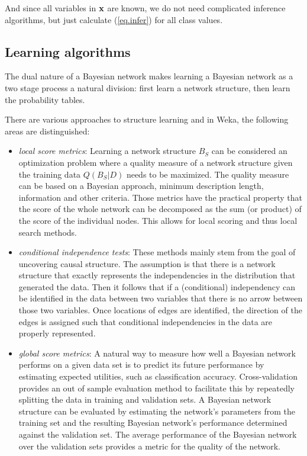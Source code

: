 And since all variables in ${\bf x}$ are known, we do not need complicated inference
algorithms, but just calculate (\ref{eq.infer}) for all class values.

\subsection*{Learning algorithms}

The dual nature of a Bayesian network makes learning a Bayesian
network as a two stage process a natural division: first learn a
network structure, then learn the probability tables.

There are various approaches to structure learning and in Weka, the
following areas are distinguished:

\begin{itemize}
\item {\em local score metrics}: 
Learning a network structure $B_S$ can be considered an optimization
problem where a quality measure of a network structure given the
training data $Q(B_S|D)$ needs to be maximized. The quality measure
can be based on a Bayesian approach,  minimum description length,
information and other criteria. Those metrics have the practical property
that the score of the whole network can be decomposed as the sum 
(or product) of the score of the individual nodes. This allows for 
local scoring and thus local search methods.

\item {\em conditional independence tests}:
These methods mainly stem from the goal of uncovering causal structure.
The assumption is that there is a network structure that exactly represents
the independencies in the distribution that generated the data. Then it
follows that if a (conditional) independency can be identified in the data
between two variables that there is no arrow between those two 
variables. Once locations of edges are identified, the direction of the edges
is assigned such that conditional independencies in the data are properly
represented.

\item {\em global score metrics}:
A natural way to measure how well a Bayesian network performs on a
given data set is to predict its future performance by estimating
expected utilities, such as classification accuracy.  Cross-validation
provides an out of sample evaluation method to facilitate this by
repeatedly splitting the data in training and validation sets.  A
Bayesian network structure  can be evaluated by estimating the
network's parameters from the training set and the resulting Bayesian
network's performance determined against the validation set.  The
average performance of the Bayesian network over the validation sets
provides a metric for the quality of the network.


\end{itemize}
